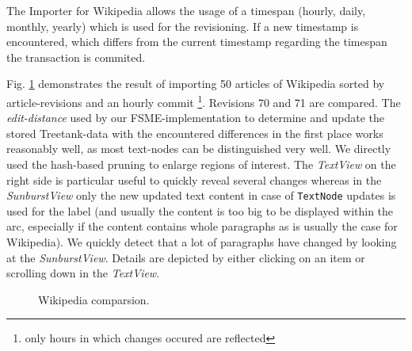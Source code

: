 The Importer for Wikipedia allows the usage of a timespan (hourly, daily, monthly, yearly) which is used for the revisioning. If a new timestamp is encountered, which differs from the current timestamp regarding the timespan the transaction is commited.

Fig. \ref{fig:wikivis} demonstrates the result of importing 50 articles of Wikipedia sorted by article-revisions and an hourly commit \footnote{only hours in which changes occured are reflected}. Revisions 70 and 71 are compared. The \emph{edit-distance} used by our FSME-implementation to determine and update the stored Treetank-data with the encountered differences in the first place works reasonably well, as most text-nodes can be distinguished very well. We directly used the hash-based pruning to enlarge regions of interest. The \emph{TextView} on the right side is particular useful to quickly reveal several changes whereas in the \emph{SunburstView} only the new updated text content in case of \texttt{TextNode} updates is used for the label (and usually the content is too big to be displayed within the arc, especially if the content contains whole paragraphs as is usually the case for Wikipedia). We quickly detect that a lot of paragraphs have changed by looking at the \emph{SunburstView}. Details are depicted by either clicking on an item or scrolling down in the \emph{TextView}. %

\begin{figure}[tb]
\caption{\label{fig:wikivis} Wikipedia comparsion.}
\end{figure}

